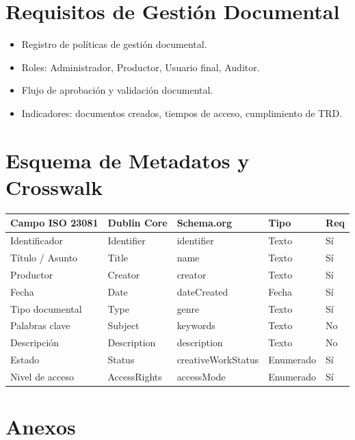 \documentclass[12pt,a4paper]{article}
\begin{document}
\section{Requisitos de Gestión Documental}
\begin{itemize}
    \item Registro de políticas de gestión documental.
    \item Roles: Administrador, Productor, Usuario final, Auditor.
    \item Flujo de aprobación y validación documental.
    \item Indicadores: documentos creados, tiempos de acceso, cumplimiento de TRD.
\end{itemize}

\section{Esquema de Metadatos y Crosswalk}
\begin{longtable}{p{3cm}p{3cm}p{3cm}p{3cm}p{2cm}}
\toprule
\textbf{Campo ISO 23081} & \textbf{Dublin Core} & \textbf{Schema.org} & \textbf{Tipo} & \textbf{Req} \\
\midrule
Identificador & Identifier & identifier & Texto & Sí \\
Título / Asunto & Title & name & Texto & Sí \\
Productor & Creator & creator & Texto & Sí \\
Fecha & Date & dateCreated & Fecha & Sí \\
Tipo documental & Type & genre & Texto & Sí \\
Palabras clave & Subject & keywords & Texto & No \\
Descripción & Description & description & Texto & No \\
Estado & Status & creativeWorkStatus & Enumerado & Sí \\
Nivel de acceso & AccessRights & accessMode & Enumerado & Sí \\
\bottomrule
\end{longtable}

\section{Anexos}
\end{document}
